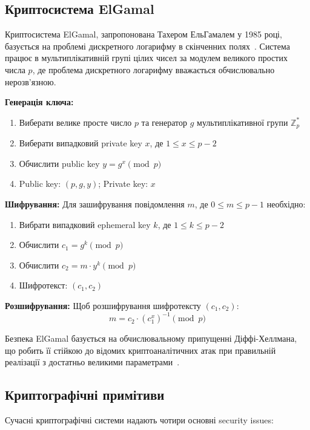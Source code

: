 \subsection{Криптосистема ElGamal}

Криптосистема ElGamal, запропонована Тахером ЕльГамалем у 1985 році, базується на проблемі дискретного логарифму в
скінченних полях~\cite{elgamal1985}. Система працює в мультиплікативній групі цілих чисел за модулем великого простих
числа $p$, де проблема дискретного логарифму вважається обчислювально нерозв'язною.

\textbf{Генерація ключа:}
\begin{enumerate}
    \item Виберати велике просте число $p$ та генератор $g$ мультиплікативної групи $\mathbb{Z}_p^*$
    \item Виберати випадковий private key $x$, де $1 \leq x \leq p-2$
    \item Обчислити public key $y = g^x \pmod p$
    \item Public key: $(p, g, y)$; Private key: $x$
\end{enumerate}

\textbf{Шифрування:} Для зашифрування повідомлення $m$, де $0 \leq m \leq p-1$ необхідно:
\begin{enumerate}
    \item Вибрати випадковий ephemeral key $k$, де $1 \leq k \leq p-2$
    \item Обчислити $c_1 = g^k \pmod p$
    \item Обчислити $c_2 = m \cdot y^k \pmod p$
    \item Шифротекст: $(c_1, c_2)$
\end{enumerate}

\textbf{Розшифрування:} Щоб розшифрування шифротексту $(c_1, c_2)$:
\begin{equation*}
    m = c_2 \cdot (c_1^x)^{-1} \pmod p
\end{equation*}

Безпека ElGamal базується на обчислювальному припущенні Діффі-Хеллмана, що робить її стійкою до відомих криптоаналітичних
атак при правильній реалізації з достатньо великими параметрами~\cite{elgamal1985}.

\subsection{Криптографічні примітиви}

Сучасні криптографічні системи надають чотири основні security issues:


